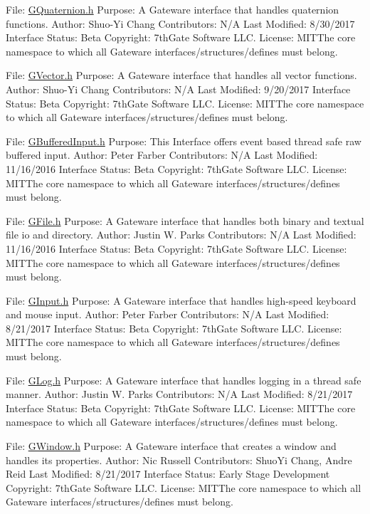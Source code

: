 File\+: \mbox{\hyperlink{GQuaternion_8h_source}{G\+Quaternion.\+h}} Purpose\+: A Gateware interface that handles quaternion functions. Author\+: Shuo-\/\+Yi Chang Contributors\+: N/A Last Modified\+: 8/30/2017 Interface Status\+: Beta Copyright\+: 7th\+Gate Software L\+LC. License\+: M\+I\+T\+The core namespace to which all Gateware interfaces/structures/defines must belong.

File\+: \mbox{\hyperlink{GVector_8h_source}{G\+Vector.\+h}} Purpose\+: A Gateware interface that handles all vector functions. Author\+: Shuo-\/\+Yi Chang Contributors\+: N/A Last Modified\+: 9/20/2017 Interface Status\+: Beta Copyright\+: 7th\+Gate Software L\+LC. License\+: M\+I\+T\+The core namespace to which all Gateware interfaces/structures/defines must belong.

File\+: \mbox{\hyperlink{GBufferedInput_8h_source}{G\+Buffered\+Input.\+h}} Purpose\+: This Interface offers event based thread safe raw buffered input. Author\+: Peter Farber Contributors\+: N/A Last Modified\+: 11/16/2016 Interface Status\+: Beta Copyright\+: 7th\+Gate Software L\+LC. License\+: M\+I\+T\+The core namespace to which all Gateware interfaces/structures/defines must belong.

File\+: \mbox{\hyperlink{GFile_8h_source}{G\+File.\+h}} Purpose\+: A Gateware interface that handles both binary and textual file io and directory. Author\+: Justin W. Parks Contributors\+: N/A Last Modified\+: 11/16/2016 Interface Status\+: Beta Copyright\+: 7th\+Gate Software L\+LC. License\+: M\+I\+T\+The core namespace to which all Gateware interfaces/structures/defines must belong.

File\+: \mbox{\hyperlink{GInput_8h_source}{G\+Input.\+h}} Purpose\+: A Gateware interface that handles high-\/speed keyboard and mouse input. Author\+: Peter Farber Contributors\+: N/A Last Modified\+: 8/21/2017 Interface Status\+: Beta Copyright\+: 7th\+Gate Software L\+LC. License\+: M\+I\+T\+The core namespace to which all Gateware interfaces/structures/defines must belong.

File\+: \mbox{\hyperlink{GLog_8h_source}{G\+Log.\+h}} Purpose\+: A Gateware interface that handles logging in a thread safe manner. Author\+: Justin W. Parks Contributors\+: N/A Last Modified\+: 8/21/2017 Interface Status\+: Beta Copyright\+: 7th\+Gate Software L\+LC. License\+: M\+I\+T\+The core namespace to which all Gateware interfaces/structures/defines must belong.

File\+: \mbox{\hyperlink{GWindow_8h_source}{G\+Window.\+h}} Purpose\+: A Gateware interface that creates a window and handles its properties. Author\+: Nic Russell Contributors\+: Shuo\+Yi Chang, Andre Reid Last Modified\+: 8/21/2017 Interface Status\+: Early Stage Development Copyright\+: 7th\+Gate Software L\+LC. License\+: M\+I\+T\+The core namespace to which all Gateware interfaces/structures/defines must belong. 